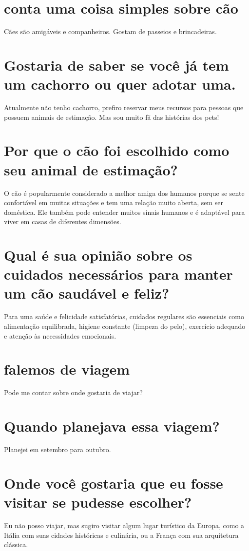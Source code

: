 \documentclass[11pt,a4paper]{article}
\begin{document}
\section{conta uma coisa simples sobre cão}
Cães são amigáveis e companheiros. Gostam de passeios e brincadeiras.

\section{Gostaria de saber se você já tem um cachorro ou quer adotar uma.}
Atualmente não tenho cachorro, prefiro reservar meus recursos para pessoas que possuem animais de estimação. Mas sou muito fã das histórias dos pets!

\section{Por que o cão foi escolhido como seu animal de estimação?}
O cão é popularmente considerado a melhor amiga dos humanos porque se sente confortável em muitas situações e tem uma relação muito aberta, sem ser doméstica. Ele também pode entender muitos sinais humanos e é adaptável para viver em casas de diferentes dimensões.

\section{Qual é sua opinião sobre os cuidados necessários para manter um cão saudável e feliz?}
Para uma saúde e felicidade satisfatórias, cuidados regulares são essenciais como alimentação equilibrada, higiene constante (limpeza do pelo), exercício adequado e atenção às necessidades emocionais.

\section{falemos de viagem}
Pode me contar sobre onde gostaria de viajar?

\section{Quando planejava essa viagem?}
Planejei em setembro para outubro.

\section{Onde você gostaria que eu fosse visitar se pudesse escolher?}
Eu não posso viajar, mas sugiro visitar algum lugar turístico da Europa, como a Itália com suas cidades históricas e culinária, ou a França com sua arquitetura clássica.
\end{document}
